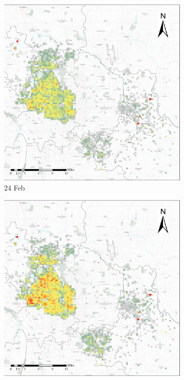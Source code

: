 \documentclass[preprints,ijgi,submit,moreauthors]{Definitions/mdpi}
\begin{document}
\begin{figure}[H]
    \vspace{6pt}
    \begin{subfigure}{.23\textwidth}
        \includegraphics[width=\textwidth]{Figures/Overall_spatial_patterns/FN5_D2020_02_22.eps}
        \caption{24 Feb}
    \end{subfigure}
    \begin{subfigure}{.23\textwidth}
        \includegraphics[width=\textwidth]{Figures/Overall_spatial_patterns/FN5_D2020_02_26.eps}

\end{subfigure}
\end{figure}
\end{document}
